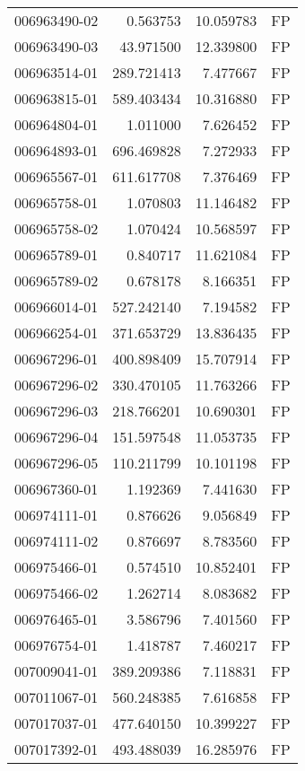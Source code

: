 \begin{tabular}{lrrl}
006963490-02 &    0.563753 &    10.059783 &   FP \\
006963490-03 &   43.971500 &    12.339800 &   FP \\
006963514-01 &  289.721413 &     7.477667 &   FP \\
006963815-01 &  589.403434 &    10.316880 &   FP \\
006964804-01 &    1.011000 &     7.626452 &   FP \\
006964893-01 &  696.469828 &     7.272933 &   FP \\
006965567-01 &  611.617708 &     7.376469 &   FP \\
006965758-01 &    1.070803 &    11.146482 &   FP \\
006965758-02 &    1.070424 &    10.568597 &   FP \\
006965789-01 &    0.840717 &    11.621084 &   FP \\
006965789-02 &    0.678178 &     8.166351 &   FP \\
006966014-01 &  527.242140 &     7.194582 &   FP \\
006966254-01 &  371.653729 &    13.836435 &   FP \\
006967296-01 &  400.898409 &    15.707914 &   FP \\
006967296-02 &  330.470105 &    11.763266 &   FP \\
006967296-03 &  218.766201 &    10.690301 &   FP \\
006967296-04 &  151.597548 &    11.053735 &   FP \\
006967296-05 &  110.211799 &    10.101198 &   FP \\
006967360-01 &    1.192369 &     7.441630 &   FP \\
006974111-01 &    0.876626 &     9.056849 &   FP \\
006974111-02 &    0.876697 &     8.783560 &   FP \\
006975466-01 &    0.574510 &    10.852401 &   FP \\
006975466-02 &    1.262714 &     8.083682 &   FP \\
006976465-01 &    3.586796 &     7.401560 &   FP \\
006976754-01 &    1.418787 &     7.460217 &   FP \\
007009041-01 &  389.209386 &     7.118831 &   FP \\
007011067-01 &  560.248385 &     7.616858 &   FP \\
007017037-01 &  477.640150 &    10.399227 &   FP \\
007017392-01 &  493.488039 &    16.285976 &   FP \\

\end{tabular}
